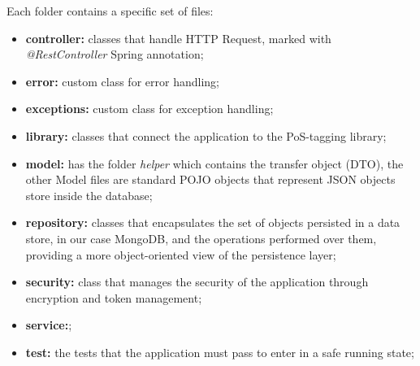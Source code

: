 Each folder contains a specific set of files:
\begin{itemize}
\item  \textbf{controller:} classes that handle HTTP Request, marked with \textit{@RestController} Spring annotation;
\item  \textbf{error:} custom class for error handling;
\item  \textbf{exceptions:} custom class for exception handling;
\item  \textbf{library:} classes that connect the application to the PoS-tagging library;
\item  \textbf{model:} has the folder \textit{helper} which contains the transfer object (DTO), the other Model files are standard POJO objects that represent JSON objects store inside the database;
\item  \textbf{repository:} classes that encapsulates the set of objects persisted in a data store, in our case MongoDB, and the operations performed over them, providing a more object-oriented view of the persistence layer;
\item  \textbf{security:} class that manages the security of the application through encryption and token management;
\item  \textbf{service:};
\item  \textbf{test:}  the tests that the application must pass to enter in a safe running state;

\end{itemize}